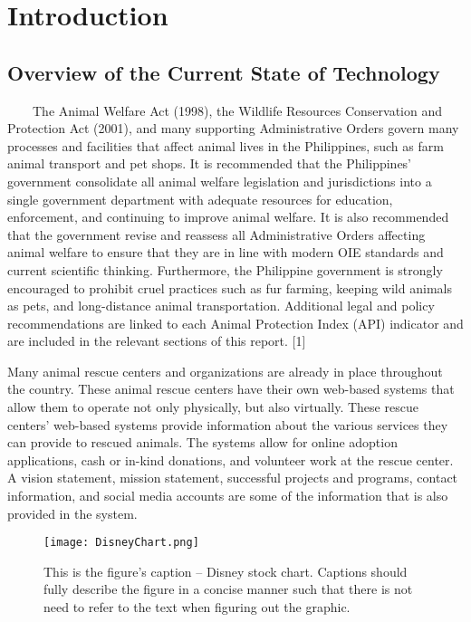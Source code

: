 \chapter{Introduction}
\label{sec:researchdesc}    %

\section{Overview of the Current State of Technology}
\label{sec:overview}

~~~~The Animal Welfare Act (1998), the Wildlife Resources Conservation and Protection Act (2001), and many supporting Administrative Orders govern many processes and facilities that affect animal lives in the Philippines, such as farm animal transport and pet shops. It is recommended that the Philippines' government consolidate all animal welfare legislation and jurisdictions into a single government department with adequate resources for education, enforcement, and continuing to improve animal welfare. It is also recommended that the government revise and reassess all Administrative Orders affecting animal welfare to ensure that they are in line with modern OIE standards and current scientific thinking. Furthermore, the Philippine government is strongly encouraged to prohibit cruel practices such as fur farming, keeping wild animals as pets, and long-distance animal transportation. Additional legal and policy recommendations are linked to each Animal Protection Index (API) indicator and are included in the relevant sections of this report. [1] 

Many animal rescue centers and organizations are already in place throughout the country. These animal rescue centers have their own web-based systems that allow them to operate not only physically, but also virtually. These rescue centers' web-based systems provide information about the various services they can provide to rescued animals. The systems allow for online adoption applications, cash or in-kind donations, and volunteer work at the rescue center. A vision statement, mission statement, successful projects and programs, contact information, and social media accounts are some of the information that is also provided in the system.

  
\begin{figure}[t]                %
   \centering                    %
   \texttt{[image: DisneyChart.png]}      %
   \caption{This is the figure's caption -- Disney stock chart.
   	Captions should fully describe the figure in a concise manner  such that there is not need to refer to the text when figuring out the graphic.}
    \label{fig:disneystock}
\end{figure}


